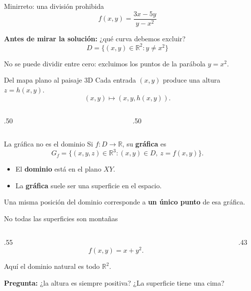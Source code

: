 \documentclass[main.tex]{subfiles}
\begin{document}
\begin{frame}{Minirreto: una división prohibida}
\[
 f(x,y)=\frac{3x-5y}{y-x^2}
\]
\medskip

\textbf{Antes de mirar la solución:} ¿qué curva debemos excluir?
\pause
\[
\boxed{D=\{(x,y)\in\mathbb R^2:y\ne x^2\}}
\]
\medskip

No se puede dividir entre cero: excluimos los puntos de la parábola $y=x^2$.
\end{frame}

\begin{frame}{Del mapa plano al paisaje 3D}
Cada entrada $(x,y)$ produce una altura $z=h(x,y)$.
\[
(x,y)\longmapsto(x,y,h(x,y)).
\]
\begin{columns}[c]
\begin{column}{.50\textwidth}
\end{column}
\begin{column}{.50\textwidth}
\end{column}
\end{columns}
\end{frame}

\begin{frame}{La gráfica no es el dominio}
Si $f:D\to\mathbb R$, su \textbf{gráfica} es
\[
G_f=\{(x,y,z)\in\mathbb R^3:(x,y)\in D,\ z=f(x,y)\}.
\]
\medskip

\begin{itemize}
\item El \textbf{dominio} está en el plano $XY$.
\item La \textbf{gráfica} suele ser una superficie en el espacio.
\end{itemize}
\medskip

Una misma posición del dominio corresponde a \textbf{un único punto} de esa gráfica.
\end{frame}

\begin{frame}{No todas las superficies son montañas}
\begin{columns}[c]
\begin{column}{.55\textwidth}
\[
f(x,y)=x+y^2.
\]
\medskip

Aquí el dominio natural es todo $\mathbb R^2$.
\medskip

\textbf{Pregunta:} ¿la altura es siempre positiva? ¿La superficie tiene una cima?
\end{column}
\begin{column}{.43\textwidth}
\end{column}
\end{columns}
\end{frame}
\end{document}
